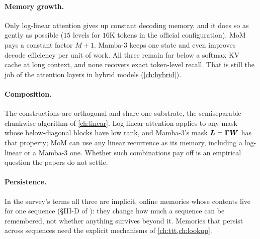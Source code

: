 \paragraph{Memory growth.} Only log-linear attention gives up constant decoding memory, and it
does so as gently as possible ($15$ levels for $16$K tokens in the official configuration).
MoM pays a constant factor $M+1$. Mamba-3 keeps one state and even improves decode
efficiency per unit of work. All three remain far below a softmax KV cache at long context,
and none recovers exact token-level recall. That is still the job of the attention layers in
hybrid models (\cref{ch:hybrid}).

\paragraph{Composition.} The constructions are orthogonal and share one substrate, the
semiseparable chunkwise algorithm of \cref{ch:linear}. Log-linear attention applies to any
mask whose below-diagonal blocks have low rank, and Mamba-3's mask $\bm{L} = \bm\Gamma\bm{W}$ has that
property; MoM can use any linear recurrence as its memory, including a log-linear or a
Mamba-3 one. Whether such combinations pay off is an empirical question the papers do not
settle.

\paragraph{Persistence.} In the survey's terms all three are implicit, online memories whose
contents live for one sequence (\S III-D of \citet{zhoubian2026memory}): they change how much
a sequence can be remembered, not whether anything survives beyond it. Memories that persist
across sequences need the explicit mechanisms of \cref{ch:ttt,ch:lookup}.

